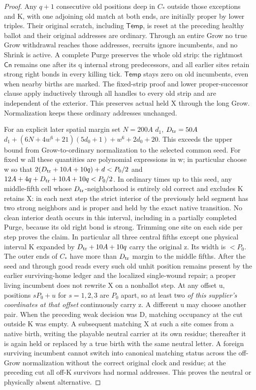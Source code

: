 \begin{proof}
Any \(q+1\) consecutive old positions deep in \(C_*\) outside those exceptions and K, with one adjoining old match at both ends, are initially proper by lower triples. Their original scratch, including \(\mathsf{Temp}\), is reset at the preceding healthy ballot and their original addresses are ordinary. Through an entire Grow no true Grow withdrawal reaches those addresses, recruits ignore incumbents, and no Shrink is active. A complete Purge preserves the whole old strip: the rightmost \(\mathsf{Cn}\) remains one after its q internal strong predecessors, and all earlier sites retain strong right bonds in every killing tick. \(\mathsf{Temp}\) stays zero on old incumbents, even when nearby births are marked. The fixed-strip proof and lower proper-successor clause apply inductively through all handles to every old strip and are independent of the exterior. This preserves actual held X through the long Grow. Normalization keeps these ordinary addresses unchanged.

For an explicit later spatial margin set \(N=200A\) \(d_1\), \(D_{\rm tr}=50A\) \(d_1+(6N+4w^6+21)(5d_0+1)+w^6+2d_0+20\). This exceeds the upper bound from Grow-to-ordinary normalization to the selected common seed. For fixed w all these quantities are polynomial expressions in w; in particular choose w so that \(2(D_{\rm tr}+10A+10q)+d<P_0/2\) and \(12A+4q+D_{\rm tr}+10A+10q<P_0/2\). In ordinary times up to this seed, any middle-fifth cell whose \(D_{\rm tr}\)-neighborhood is entirely old correct and excludes K retains X: in each next step the strict interior of the previously held segment has two strong neighbors and is proper and held by the exact native transition. No clean interior death occurs in this interval, including in a partially completed Purge, because its old right bond is strong. Trimming one site on each side per step proves the claim. In particular all three central fifths except one physical interval K expanded by \(D_{\rm tr}+10A+10q\) carry the original z. Its width is \(<P_0\). The outer ends of \(C_*\) have more than \(D_{\rm tr}\) margin to the middle fifths. After the seed and through good reads every such old unhit position remains present by the earlier surviving-home ledger and the localized single-wound repair; a proper living incumbent does not rewrite X on a nonballot step. At any offset u, positions \(sP_0+u\) for \(s=1,2,3\) are \(P_0\) apart, so at least two \emph{of this supplier's coordinates at that offset} continuously carry z. A different u may choose another pair. When the preceding weak decision was D, matching occupancy at the cut outside K was empty. A subsequent matching X at such a site comes from a native birth, writing the playable neutral carrier at its own residue; thereafter it is again held or replaced by a true birth with the same neutral letter. A foreign surviving incumbent cannot switch into canonical matching status across the off-Grow normalization without the correct original clock and residue; at the preceding cut all off-K survivors had normal addresses. This proves the neutral or physically absent alternative.


\end{proof}
